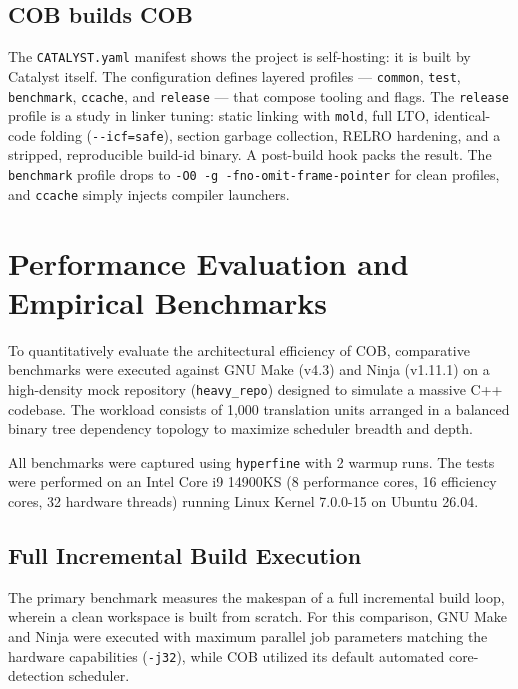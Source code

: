 \documentclass[11pt]{article}
\begin{document}
\subsection{COB builds COB}

The \texttt{CATALYST.yaml} manifest shows the project is self-hosting: it is
built by Catalyst itself. The configuration defines layered profiles ---
\texttt{common}, \texttt{test}, \texttt{benchmark}, \texttt{ccache}, and
\texttt{release} --- that compose tooling and flags. The \texttt{release} profile
is a study in linker tuning: static linking with \texttt{mold}, full LTO,
identical-code folding (\lstinline|--icf=safe|), section garbage collection,
RELRO hardening, and a stripped, reproducible build-id binary. A post-build hook
packs the result. The \texttt{benchmark} profile drops to \lstinline|-O0 -g -fno-omit-frame-pointer| for clean profiles, and \texttt{ccache} simply injects
compiler launchers.

\section{Performance Evaluation and Empirical Benchmarks}

To quantitatively evaluate the architectural efficiency of COB, comparative benchmarks were executed against GNU Make (v4.3) and Ninja (v1.11.1) on a high-density mock repository (\texttt{heavy\_repo}) designed to simulate a massive C++ codebase. The workload consists of 1,000 translation units arranged in a balanced binary tree dependency topology to maximize scheduler breadth and depth.

All benchmarks were captured using \texttt{hyperfine} with 2 warmup runs.
The tests were performed on an Intel Core i9 14900KS (8 performance cores, 16 efficiency cores, 32 hardware threads)
running Linux Kernel 7.0.0-15 on Ubuntu 26.04.

\subsection{Full Incremental Build Execution}

The primary benchmark measures the makespan of a full incremental build loop, wherein a clean workspace is built from scratch. For this comparison, GNU Make and Ninja were executed with maximum parallel job parameters matching the hardware capabilities (\texttt{-j32}), while COB utilized its default automated core-detection scheduler.
\end{document}
